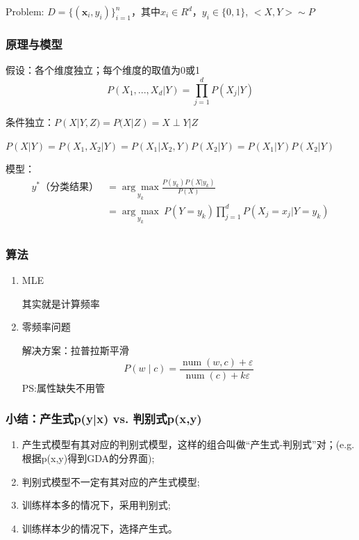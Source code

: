 \documentclass[UTF8]{ctexart}
\begin{document}
Problem: $D=\{( \boldsymbol{x}_{i},y_i)\}_{i=1}^{n}$，其中$x_i \in R^d$，$y_i\in \{0,1\}$,  $<X,Y> \sim P$

\dotfill

\subsubsection{原理与模型}

假设：各个维度独立；每个维度的取值为0或1
$$
P(X_1,...,X_d|Y)=\prod^d_{j=1}P(X_j|Y)
$$

\dotfill

 条件独立：$P(X|Y,Z)=P(X|Z)=X\perp Y|Z$
 
 $P(X|Y)=P(X_1,X_2|Y)=P(X_1|X_2,Y)P(X_2|Y)=P(X_1|Y)P(X_2|Y)$
 
 \dotfill

模型：
$$
\begin{aligned}
y^*（分类结果）&=\underset{y_k}{\arg \max } \frac{P(y_k)P(X|y_k)}{P(X)}\\
&=\underset{y_k}{\arg \max }~{P(Y=y_k)\prod_{j=1}^d P(X_j=x_j|Y=y_k)}\\
\end{aligned}
$$



\subsubsection{算法}
\begin{enumerate}
    \item MLE
    
    其实就是计算频率
    \item 零频率问题

解决方案：拉普拉斯平滑
$$
P(w \mid c)=\frac{\operatorname{num}(w, c)+\varepsilon}{\operatorname{num}(c)+k \varepsilon}
$$
PS:属性缺失不用管

\end{enumerate}


\subsubsection{小结：产生式p(y|x) vs. 判别式p(x,y)}
\begin{enumerate}
    \item 产生式模型有其对应的判别式模型，这样的组合叫做“产生式-判别式”对；(e.g. 根据p(x,y)得到GDA的分界面);
    \item 判别式模型不一定有其对应的产生式模型;
    \item 训练样本多的情况下，采用判别式;
    \item 训练样本少的情况下，选择产生式。
\end{enumerate}
\end{document}
